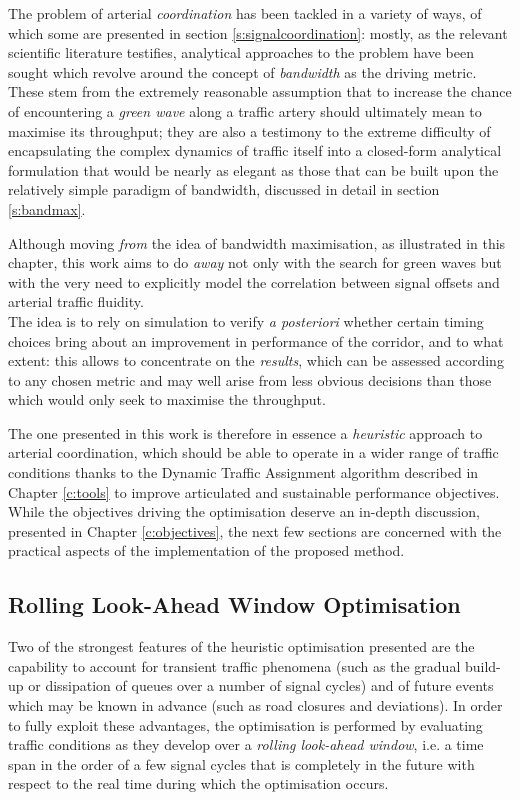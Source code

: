 The problem of arterial \emph{coordination} has been tackled in a variety of ways, of which some are presented in section \ref{s:signalcoordination}: mostly, as the relevant scientific literature testifies, analytical approaches to the problem have been sought which revolve around the concept of \emph{bandwidth} as the driving metric. These stem  from the extremely reasonable assumption that to increase the chance of encountering a \emph{green wave} along a traffic artery should ultimately mean to maximise its throughput; they are also a testimony to the extreme difficulty of encapsulating the complex dynamics of traffic itself into a closed-form analytical formulation that would be nearly as elegant as those that can be built upon the relatively simple paradigm of bandwidth, discussed in detail in section \ref{s:bandmax}.

Although moving \emph{from} the idea of bandwidth maximisation, as illustrated in this chapter, this work aims to do \emph{away} not only with the search for green waves but with the very need to explicitly model the correlation between signal offsets and arterial traffic fluidity. \\
The idea is to rely on simulation to verify \emph{a posteriori} whether certain timing choices bring about an improvement in performance of the corridor, and to what extent: this allows to concentrate on the \emph{results}, which can be assessed according to any chosen metric and may well arise from less obvious decisions than those which would only seek to maximise the throughput.

The one presented in this work is therefore in essence a \emph{heuristic} approach to arterial coordination, which should be able to operate in a wider range of traffic conditions thanks to the Dynamic Traffic Assignment algorithm described in Chapter \ref{c:tools} to improve articulated and sustainable performance objectives. While the objectives driving the optimisation deserve an in-depth discussion, presented in Chapter \ref{c:objectives}, the next few sections are concerned with the practical aspects of the implementation of the proposed method.



\subsection{Rolling Look-Ahead Window Optimisation}
Two of the strongest features of the heuristic optimisation presented are the capability to account for transient traffic phenomena (such as the gradual build-up or dissipation of queues over a number of signal cycles) and of future events which may be known in advance (such as road closures and deviations). In order to fully exploit these advantages, the optimisation is performed by evaluating traffic conditions as they develop over a \emph{rolling look-ahead window}, i.e. a time span in the order of a few signal cycles that is completely in the future with respect to the real time during which the optimisation occurs.

